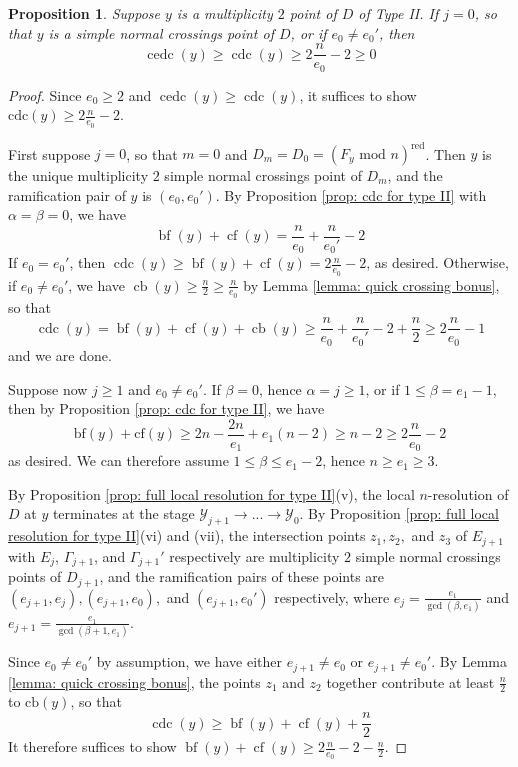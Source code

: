 \documentclass[12pt]{amsart}
\numberwithin{equation}{section}
\newtheorem{prop}[equation]{Proposition}
\theoremstyle{definition}
\newcommand{\Y}{\mathcal{Y}}
\newcommand{\tx}[1]{\text{#1}}
\DeclareMathOperator{\blf}{bf}
\DeclareMathOperator{\cf}{cf}
\DeclareMathOperator{\cb}{cb}
\DeclareMathOperator{\cdc}{cdc}
\DeclareMathOperator{\cedc}{cedc}
\begin{document}
\begin{prop}\label{prop: stronger positivity for type II}
    Suppose $y$ is a multiplicity $2$ point of $D$ of Type II. If $j=0$, so that $y$ is a simple normal crossings point of $D$, or if $e_0\neq e_0'$, then \[\cedc(y)\geq\cdc(y)\geq2\frac{n}{e_0}-2\geq0\]
\end{prop}
\begin{proof}
    Since $e_0\geq 2$ and $\cedc(y)\geq\cdc(y)$, it suffices to show $\tx{cdc}(y)\geq 2\frac{n}{e_0}-2$. 
    
    First suppose $j=0$, so that $m=0$ and $D_m=D_0=(F_y\tx{ mod }n)^\tx{red}$. Then $y$ is the unique multiplicity $2$ simple normal crossings point of $D_m$, and the ramification pair of $y$ is $(e_0,e_0')$. By Proposition \ref{prop: cdc for type II} with $\alpha=\beta=0$, we have
    \[\blf(y)+\cf(y)=\frac{n}{e_0}+\frac{n}{e_0'}-2\]
    If $e_0=e_0'$, then $\cdc(y)\geq\blf(y)+\cf(y)=2\frac{n}{e_0}-2$, as desired. Otherwise, if $e_0\neq e_0'$, we have $\cb(y)\geq \frac{n}{2}\geq\frac{n}{e_0}$ by Lemma \ref{lemma: quick crossing bonus},
    so that
    \[\cdc(y)=\blf(y)+\cf(y)+\cb(y)\geq\frac{n}{e_0}+\frac{n}{e_0'}-2+\frac{n}{2}\geq2\frac{n}{e_0}-1\]
    and we are done.

    Suppose now $j\geq 1$ and $e_0\neq e_0'$.
    If $\beta=0$, hence $\alpha=j\geq 1$, or if $1\leq\beta=e_1-1$, then by Proposition \ref{prop: cdc for type II}, we have 
    \[\tx{bf}(y)+\tx{cf}(y)\geq 2n-\frac{2n}{e_1}+e_1(n-2)\geq n-2\geq2\frac{n}{e_0}-2\]
    as desired. We can therefore assume $1\leq \beta\leq e_1-2$, hence
    $n\geq e_1\geq 3$.
    
    By Proposition \ref{prop: full local resolution for type II}(v), the local $n$-resolution of $D$ at $y$ terminates at the stage $\Y_{j+1}\to...\to\Y_0$. By Proposition \ref{prop: full local resolution for type II}(vi) and (vii), the intersection points $z_1,z_2,$ and $z_3$ of $E_{j+1}$ with $E_j$, $\Gamma_{j+1}$, and $\Gamma_{j+1}'$ respectively are multiplicity $2$ simple normal crossings points of $D_{j+1}$, and the ramification pairs of these points are $(e_{j+1},e_j),(e_{j+1},e_0),$ and $(e_{j+1},e_0')$ respectively, where $e_j=\frac{e_1}{\gcd(\beta,e_1)}$ and $e_{j+1}=\frac{e_1}{\gcd(\beta+1,e_1)}$.


    Since $e_0\neq e_0'$ by assumption, we have either $e_{j+1}\neq e_0$ or $e_{j+1}\neq e_0'$. By Lemma \ref{lemma: quick crossing bonus}, the points $z_1$ and $z_2$ together contribute at least $\frac{n}{2}$ to $\tx{cb}(y)$, so that 
    \begin{equation}\label{equation: prelim bound}
        \cdc(y)\geq\blf(y)+\cf(y)+\frac{n}{2}
    \end{equation}
    It therefore suffices to show $\blf(y)+\cf(y)\geq 2\frac{n}{e_0}-2-\frac{n}{2}$.


\end{proof}
\end{document}
